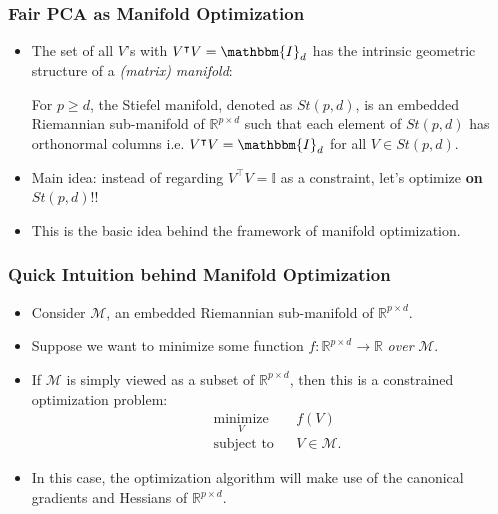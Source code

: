 \documentclass{beamer}
\begin{document}
\begin{frame}
	\frametitle{Fair PCA as Manifold Optimization}
	\begin{itemize}
		\item The set of all $V$'s with $V^\intercal V = \mathbbm{I}_d$ has the intrinsic geometric structure of a {\it (matrix) manifold}:
		\begin{definition}
			For $p \geq d$, the Stiefel manifold, denoted as $St(p, d)$, is an embedded Riemannian sub-manifold of $\mathbb{R}^{p \times d}$ such that each element of $St(p, d)$ has orthonormal columns i.e. $V^\intercal V = \mathbbm{I}_d$ for all $V \in St(p, d)$. 
		\end{definition}
		
		
		\item Main idea: instead of regarding $V^\intercal V = \mathbb{I}$ as a constraint, let's optimize {\bf on} $St(p, d)$!!
		
		\item This is the basic idea behind the framework of manifold optimization.
	\end{itemize}
\end{frame}

\begin{frame}
	\frametitle{Quick Intuition behind Manifold Optimization}
	\begin{itemize}
		\item Consider $\mathcal{M}$, an embedded Riemannian sub-manifold of $\mathbb{R}^{p \times d}$.
		
		\item Suppose we want to minimize some function $f : \mathbb{R}^{p \times d} \rightarrow \mathbb{R}$ {\it over} $\mathcal{M}$.
				
		\item If $\mathcal{M}$ is simply viewed as a subset of $\mathbb{R}^{p \times d}$, then this is a constrained optimization problem:
		\begin{equation}
			\begin{aligned}
				& \underset{V}{\text{minimize}}
				& &  f(V) \\
				& \text{subject to}
				& & V \in \mathcal{M}.
			\end{aligned}
		\end{equation}
		
		\item In this case, the optimization algorithm will make use of the canonical gradients and Hessians of $\mathbb{R}^{p \times d}$.
	\end{itemize}
\end{frame}
\end{document}
